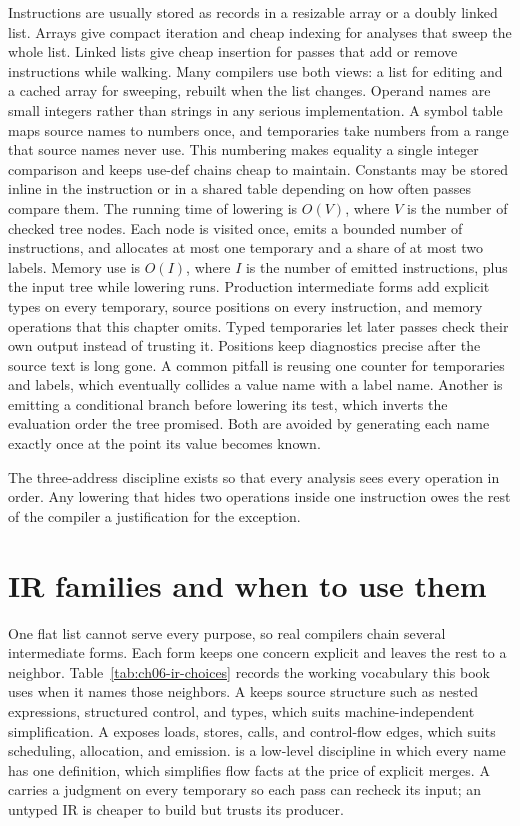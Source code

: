 Instructions are usually stored as records in a resizable array or a doubly linked list.
Arrays give compact iteration and cheap indexing for analyses that sweep the whole list.
Linked lists give cheap insertion for passes that add or remove instructions while walking.
Many compilers use both views: a list for editing and a cached array for sweeping, rebuilt when the list changes.
Operand names are small integers rather than strings in any serious implementation.
A symbol table maps source names to numbers once, and temporaries take numbers from a range that source names never use.
This numbering makes equality a single integer comparison and keeps use-def chains cheap to maintain.
Constants may be stored inline in the instruction or in a shared table depending on how often passes compare them.
The running time of lowering is $O(V)$, where $V$ is the number of checked tree nodes.
Each node is visited once, emits a bounded number of instructions, and allocates at most one temporary and a share of at most two labels.
Memory use is $O(I)$, where $I$ is the number of emitted instructions, plus the input tree while lowering runs.
Production intermediate forms add explicit types on every temporary, source positions on every instruction, and memory operations that this chapter omits.
Typed temporaries let later passes check their own output instead of trusting it.
Positions keep diagnostics precise after the source text is long gone.
A common pitfall is reusing one counter for temporaries and labels, which eventually collides a value name with a label name.
Another is emitting a conditional branch before lowering its test, which inverts the evaluation order the tree promised.
Both are avoided by generating each name exactly once at the point its value becomes known.
\begin{ccnote}
The three-address discipline exists so that every analysis sees every operation in order.
Any lowering that hides two operations inside one instruction owes the rest of the compiler a justification for the exception.
\end{ccnote}

\section{IR families and when to use them}
\label{sec:ch06-ir-families}

One flat list cannot serve every purpose, so real compilers chain several intermediate forms.
Each form keeps one concern explicit and leaves the rest to a neighbor.
Table~\ref{tab:ch06-ir-choices} records the working vocabulary this book uses when it names those neighbors.
A  keeps source structure such as nested expressions, structured control, and types, which suits machine-independent simplification.
A  exposes loads, stores, calls, and control-flow edges, which suits scheduling, allocation, and emission.
 is a low-level discipline in which every name has one definition, which simplifies flow facts at the price of explicit merges.
A  carries a judgment on every temporary so each pass can recheck its input; an untyped IR is cheaper to build but trusts its producer.

